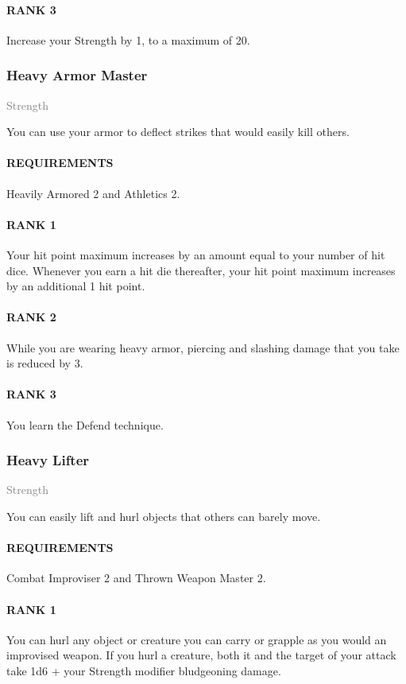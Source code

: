 \paragraph{RANK 3} Increase your Strength by 1, to a maximum of 20.

\subsubsection{Heavy Armor Master} \label{tal::heavyarmormaster}
\small{\textcolor{gray}{Strength}}

\normalsize
You can use your armor to deflect strikes that would easily kill others.
\paragraph{REQUIREMENTS} Heavily Armored 2 and Athletics 2.
\paragraph{RANK 1} Your hit point maximum increases by an amount equal to your number of hit dice.
Whenever you earn a hit die thereafter, your hit point maximum increases by an additional 1 hit point.
\paragraph{RANK 2} While you are wearing heavy armor, piercing and slashing damage that you take is reduced by 3.
\paragraph{RANK 3} You learn the Defend technique.

\subsubsection{Heavy Lifter} \label{tal::heavylifter}
\small{\textcolor{gray}{Strength}}

\normalsize
You can easily lift and hurl objects that others can barely move.
\paragraph{REQUIREMENTS} Combat Improviser 2 and Thrown Weapon Master 2.
\paragraph{RANK 1} You can hurl any object or creature you can carry or grapple as you would an improvised weapon.
If you hurl a creature, both it and the target of your attack take 1d6 + your Strength modifier bludgeoning damage.
